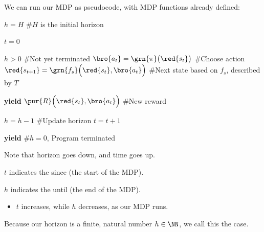         We can run our MDP as pseudocode, with MDP functions already defined:

        \begin{codebox}

                \li $h=H$ \qquad \qquad \#$H$ is the initial horizon
                
                \li $t=0$

                \li
                
                \li \While $h>0$  \qquad \qquad \#Not yet terminated
                    \Do
                        \li $\bro{a_t} = \grn{\pi}\big(\red{s_t}\big)$ \qquad \qquad \#Choose action
                        \li $\red{s_{t+1}} = \grn{f_s}\Big(\red{s_t},\bro{a_t}\Big)$ \qquad \qquad \#Next state based on $f_s$, described by $T$
                        \li
                        
                        \li \textbf{yield} $\pur{R}\Big(\red{s_t},\bro{a_t}\Big)$ \qquad \qquad \#New reward
                        \li
                        
                        \li $h=h-1$ \qquad \qquad \#Update horizon
                        \li $t=t+1$
                    \End

                \li
                \li \textbf{yield}  \qquad \qquad \#$h=0$, Program terminated
                       
        \end{codebox}

        Note that horizon goes down, and time goes up.\\

        \begin{clarification}
            $t$ indicates the  since  (the start of the MDP).

            $h$ indicates the  until  (the end of the MDP).

            \begin{itemize}
                \item $t$ increases, while $h$ decreases, as our MDP runs.
            \end{itemize}
        \end{clarification}

        Because our horizon is a finite, natural number $h \in \NN$, we call this the  case.\\

